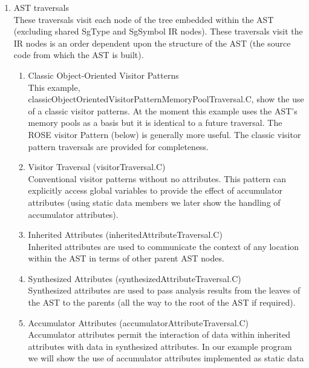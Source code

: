 \begin{enumerate}
     \begin{enumerate}
        \item AST traversals \\
              These traversals visit each node of the tree embedded within the AST
              (excluding shared SgType and SgSymbol IR nodes).  These traversals
              visit the IR nodes is an order dependent upon the structure of the AST
              (the source code from which the AST is built).
        \begin{enumerate}
          \item Classic Object-Oriented Visitor Patterns \\
                This example, classicObjectOrientedVisitorPatternMemoryPoolTraversal.C,
                show the use of a classic visitor patterns.  At the moment this example
                uses the AST's memory pools as a basis but it is identical to a future
                traversal. The ROSE visitor Pattern (below) is generally more useful. 
                The classic visitor pattern traversals are provided for completeness.
          \item Visitor Traversal (visitorTraversal.C) \\
                Conventional visitor patterns without no attributes. This pattern can 
                explicitly access global variables to provide the effect of accumulator
                attributes (using static data members we later show the handling of
                accumulator attributes).
          \item Inherited Attributes (inheritedAttributeTraversal.C) \\
                Inherited attributes are used to communicate the context of any location
                within the AST in terms of other parent AST nodes.
          \item Synthesized Attributes (synthesizedAttributeTraversal.C) \\
                Synthesized attributes are used to pass analysis results from the leaves
                of the AST to the parents (all the way to the root of the AST if
                required).
          \item Accumulator Attributes (accumulatorAttributeTraversal.C) \\
                Accumulator attributes permit the interaction of data within inherited
                attributes with data in synthesized attributes. In our example program we
                will show the use of accumulator attributes implemented as static data

\end{enumerate}
\end{enumerate}
\end{enumerate}
